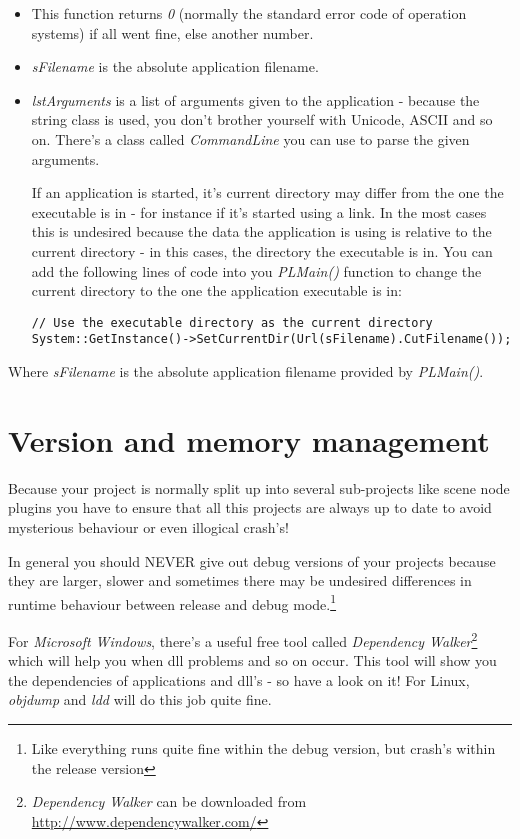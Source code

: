 \begin{itemize}
\item{This function returns \emph{0} (normally the standard error code of operation systems) if all went fine, else another number.}
\item{\emph{sFilename} is the absolute application filename.}
\item{\emph{lstArguments} is a list of arguments given to the application - because the string class is used, you don't brother yourself with Unicode, ASCII and so on. There's a class called \emph{CommandLine} you can use to parse the given arguments.}

If an application is started, it's current directory may differ from the one the executable is in - for instance if it's started using a link. In the most cases this is undesired because the data the application is using is relative to the current directory - in this cases, the directory the executable is in. You can add the following lines of code into you \emph{PLMain()} function to change the current directory to the one the application executable is in:

\begin{lstlisting}[caption=Set current directory example]
// Use the executable directory as the current directory
System::GetInstance()->SetCurrentDir(Url(sFilename).CutFilename());
\end{lstlisting}
\end{itemize}

Where \emph{sFilename} is the absolute application filename provided by \emph{PLMain()}.




\section{Version and memory management}
Because your project is normally split up into several sub-projects like scene node plugins you have to ensure that all this projects are always up to date to avoid mysterious behaviour or even illogical crash's!

In general you should NEVER give out debug versions of your projects because they are larger, slower and sometimes there may be undesired differences in runtime behaviour between release and debug mode.\footnote{Like everything runs quite fine within the debug version, but crash's within the release version}

For \emph{Microsoft Windows}, there's a useful free tool called \emph{Dependency Walker}\footnote{\emph{Dependency Walker} can be downloaded from \url{http://www.dependencywalker.com/}} which will help you when dll problems and so on occur. This tool will show you the dependencies of applications and dll's - so have a look on it! For Linux, \emph{objdump} and \emph{ldd} will do this job quite fine.

